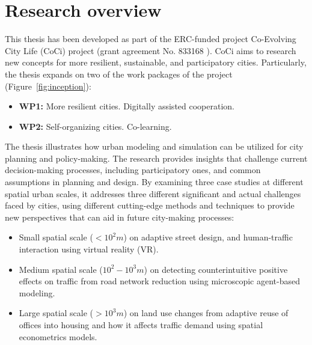 
\section{Research overview}

This thesis has been developed as part of the ERC-funded project Co-Evolving City Life (CoCi) project (grant agreement No. 833168 ). CoCi aims to research new concepts for more resilient, sustainable, and participatory cities. Particularly, the thesis expands on two of the work packages of the project (Figure~\ref{fig:inception}):
\begin{itemize}
    \item \textbf{WP1:} More resilient cities. Digitally assisted cooperation.
    \item \textbf{WP2:} Self-organizing cities. Co-learning. 
\end{itemize}

The thesis illustrates how urban modeling and simulation can be utilized for city planning and policy-making. The research provides insights that challenge current decision-making processes, including participatory ones, and common assumptions in planning and design. By examining three case studies at different spatial urban scales, it addresses three different significant and actual challenges faced by cities, using different cutting-edge methods and techniques to provide new perspectives that can aid in future city-making processes:
\begin{itemize}
    \item Small spatial scale ($<10^2 m$) on adaptive street design, and human-traffic interaction using virtual reality (VR).
    \item Medium spatial scale ($10^2 - 10^3 m$) on detecting counterintuitive positive effects on traffic from road network reduction using microscopic agent-based modeling.
    \item Large spatial scale ($>10^3 m$) on land use changes from adaptive reuse of offices into housing and how it affects traffic demand using spatial econometrics models. 
\end{itemize}

